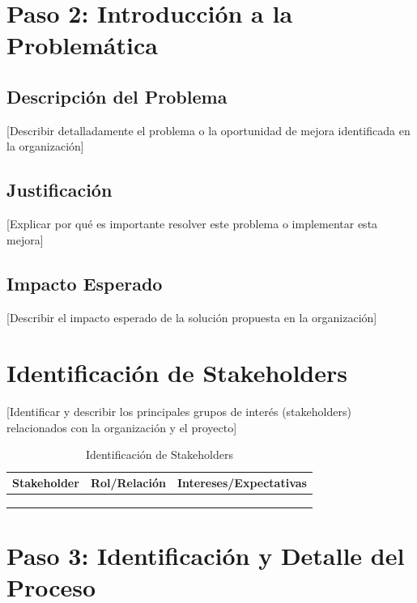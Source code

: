 \documentclass[12pt,letterpaper]{report}
\begin{document}
\section{Paso 2: Introducción a la Problemática}

\subsection{Descripción del Problema}
[Describir detalladamente el problema o la oportunidad de mejora identificada en la organización]

\subsection{Justificación}
[Explicar por qué es importante resolver este problema o implementar esta mejora]

\subsection{Impacto Esperado}
[Describir el impacto esperado de la solución propuesta en la organización]

\section{Identificación de Stakeholders}
[Identificar y describir los principales grupos de interés (stakeholders) relacionados con la organización y el proyecto]

\begin{table}[H]
    \centering
    \begin{tabularx}{\textwidth}{|X|X|X|}
        \hline
        \textbf{Stakeholder} & \textbf{Rol/Relación} & \textbf{Intereses/Expectativas} \\
        \hline
        & & \\
        \hline
        & & \\
        \hline
        & & \\
        \hline
    \end{tabularx}
    \caption{Identificación de Stakeholders}
\end{table}

\section{Paso 3: Identificación y Detalle del Proceso}
\end{document}
